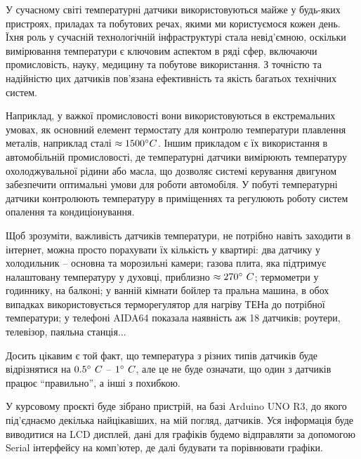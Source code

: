 \Introduction

У сучасному світі температурні датчики використовуються майже у будь-яких пристроях, приладах та побутових речах, якими ми користуємося кожен день. Їхня роль у сучасній технологічній інфраструктурі стала невід'ємною, оскільки вимірювання температури є ключовим аспектом в ряді сфер, включаючи промисловість, науку, медицину та побутове використання. З точністю та надійністю цих датчиків пов'язана ефективність та якість багатьох технічних систем. 

Наприклад, у важкої промисловості вони використовуються в екстремальних умовах, як основний елемент термостату для контролю температури плавлення металів, наприклад сталі $\approx\ignorespaces1500^\circ C$. Іншим прикладом є їх використання в автомобільній промисловості, де температурні датчики вимірюють температуру охолоджувальної рідини або масла, що дозволяє системі керування двигуном забезпечити оптимальні умови для роботи автомобіля. У побуті температурні датчики контролюють температуру в приміщеннях та регулюють роботу систем опалення та кондиціонування.

Щоб зрозуміти, важливість датчиків температури, не потрібно навіть заходити в інтернет, можна просто порахувати їх кількість у квартирі: два датчику у холодильник -- основна та морозильні камери; газова плита, яка підтримує налаштовану температуру у духовці, приблизно $\approx\ignorespaces270^\circ~C$; термометри у годиннику, на балконі; у ванній кімнати бойлер та пральна машина, в обох випадках використовується терморегулятор для нагріву ТЕНа до потрібної температури; у телефоні AIDA64 показала наявність аж 18 датчиків; роутери, телевізор, паяльна станція...

Досить цікавим є той факт, що температура з різних типів датчиків буде відрізнятися на $\ignorespaces 0.5^\circ~C$ -- $\ignorespaces 1^\circ~C$, але це не буде означати, що один з датчиків працює ``правильно'', а інші з похибкою.

У курсовому проєкті буде зібрано пристрій, на базі Arduino UNO R3, до якого під'єднаємо декілька найцікавіших, на мій погляд, датчиків. Уся інформація буде виводитися на LCD дисплей, дані для графіків будемо відправляти за допомогою Serial інтерфейсу на комп'ютер, де далі будувати та порівнювати графіки.
\clearpage
